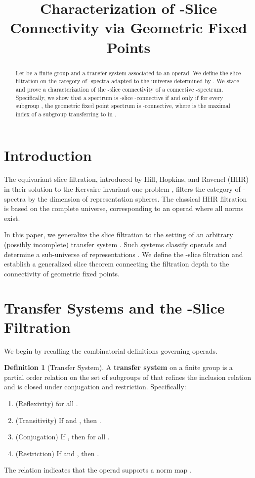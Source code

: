 \documentclass[11pt]{article}
\title{Characterization of -Slice Connectivity via Geometric Fixed Points}
\author{}
\date{}
\theoremstyle{plain}
\theoremstyle{definition}
\newtheorem{definition}[theorem]{Definition}
\begin{document}
\maketitle

\begin{abstract}
Let  be a finite group and  a transfer system associated to an  operad. We define the slice filtration on the category of -spectra adapted to the universe determined by . We state and prove a characterization of the -slice connectivity of a connective -spectrum. Specifically, we show that a spectrum  is -slice -connective if and only if for every subgroup , the geometric fixed point spectrum  is -connective, where  is the maximal index of a subgroup transferring to  in .
\end{abstract}

\section{Introduction}

The equivariant slice filtration, introduced by Hill, Hopkins, and Ravenel (HHR) in their solution to the Kervaire invariant one problem \cite{HHR}, filters the category of -spectra by the dimension of representation spheres. The classical HHR filtration is based on the complete universe, corresponding to an  operad where all norms exist.

In this paper, we generalize the slice filtration to the setting of an arbitrary (possibly incomplete) transfer system . Such systems classify  operads and determine a sub-universe of representations \cite{Rubin}. We define the -slice filtration and establish a generalized slice theorem connecting the filtration depth to the connectivity of geometric fixed points.

\section{Transfer Systems and the -Slice Filtration}

We begin by recalling the combinatorial definitions governing  operads.

\begin{definition}[Transfer System]
A \textbf{transfer system}  on a finite group  is a partial order relation  on the set of subgroups of  that refines the inclusion relation and is closed under conjugation and restriction. Specifically:
\begin{enumerate}
\item (Reflexivity)  for all .
\item (Transitivity) If  and , then .
\item (Conjugation) If , then  for all .
\item (Restriction) If  and , then .
\end{enumerate}
The relation  indicates that the operad supports a norm map .
\end{definition}
\end{document}
